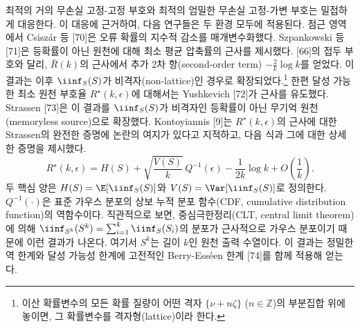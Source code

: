 최적의 거의 무손실 고정-고정 부호와 최적의 엄밀한 무손실 고정-가변 부호는 밀접하게 대응한다. 이 대응에 근거하여, 다음 연구들은 두 환경 모두에 적용된다. 점근 영역에서 Csiszár 등 [70]은 오류 확률의 지수적 감소를 매개변수화했다. Szpankowski 등 [71]은 등확률이 아닌 원천에 대해 최소 평균 압축률의 근사를 제시했다. [66]의 접두 부호와 달리, $\bar{R}(k)$의 근사에서 추가 2차 항(second-order term) $-\frac{2}{k}\log k$를 얻었다. 이 결과는 이후 $\iinf_S(S)$가 비격자(non-lattice)인 경우로 확장되었다.\footnote{이산 확률변수의 모든 확률 질량이 어떤 격자 $\{\nu+n\zeta\}$ ($n\in\mathbb{Z}$)의 부분집합 위에 놓이면, 그 확률변수를 격자형(lattice)이라 한다.} 한편 달성 가능한 최소 원천 부호율 $R^\star(k,\epsilon)$에 대해서는 Yushkevich [72]가 근사를 유도했다. Strassen [73]은 이 결과를 $\iinf_S(S)$가 비격자인 등확률이 아닌 무기억 원천(memoryless source)으로 확장했다. Kontoyiannis [9]는 $R^\star(k,\epsilon)$의 근사에 대한 Strassen의 완전한 증명에 논란의 여지가 있다고 지적하고, 다음 식과 그에 대한 상세한 증명을 제시했다.
\begin{equation}
R^\star(k,\epsilon)=H(S)+\sqrt{\frac{V(S)}{k}}\,Q^{-1}(\epsilon)-\frac{1}{2k}\log k+O\!\left(\frac{1}{k}\right). \tag{7}
\end{equation}
두 핵심 양은 $H(S)=\E[\iinf_S(S)]$와 $V(S)=\Var[\iinf_S(S)]$로 정의한다. $Q^{-1}(\cdot)$은 표준 가우스 분포의 상보 누적 분포 함수(CDF, cumulative distribution function)의 역함수이다. 직관적으로 보면, 중심극한정리(CLT, central limit theorem)에 의해 $\iinf_{S^k}(S^k)=\sum_{i=1}^k\iinf_S(S_i)$의 분포가 근사적으로 가우스 분포이기 때문에 이런 결과가 나온다. 여기서 $S^k$는 길이 $k$인 원천 출력 수열이다. 이 결과는 정밀한 역 한계와 달성 가능성 한계에 고전적인 Berry-Esséen 한계 [74]를 함께 적용해 얻는다.
